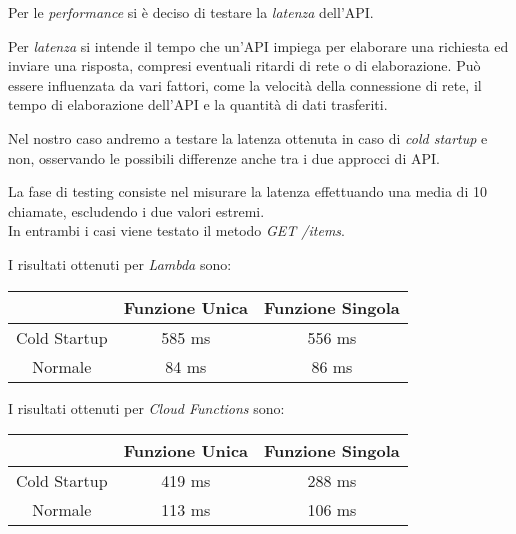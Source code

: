 Per le \textit{performance} si è deciso di testare la \textit{latenza} dell'API.

Per \textit{latenza} si intende il tempo che un'API impiega per elaborare una richiesta ed inviare una risposta, compresi eventuali ritardi di rete o di elaborazione. Può essere influenzata da vari fattori, come la velocità della connessione di rete, il tempo di elaborazione dell'API e la quantità di dati trasferiti.

Nel nostro caso andremo a testare la latenza ottenuta in caso di \textit{cold startup} e non, osservando le possibili differenze anche tra i due approcci di API.

La fase di testing consiste nel misurare la latenza effettuando una media di 10 chiamate, escludendo i due valori estremi.\\
In entrambi i casi viene testato il metodo \textit{GET /items}.

I risultati ottenuti per \textit{Lambda} sono:
\begin{table}[H]
    \centering
    \begin{tabular}{|c|c|c|}
    \hline
        \textbf{} & \textbf{Funzione Unica} & \textbf{Funzione Singola} \\ \hline
        Cold Startup & 585 ms & 556 ms \\ \hline
        Normale & 84 ms & 86 ms \\ \hline
    \end{tabular}
\end{table}

I risultati ottenuti per \textit{Cloud Functions} sono:
\begin{table}[H]
    \centering
    \begin{tabular}{|c|c|c|}
    \hline
        \textbf{} & \textbf{Funzione Unica} & \textbf{Funzione Singola} \\ \hline
        Cold Startup & 419 ms & 288 ms \\ \hline
        Normale & 113 ms & 106 ms \\ \hline
    \end{tabular}
\end{table}